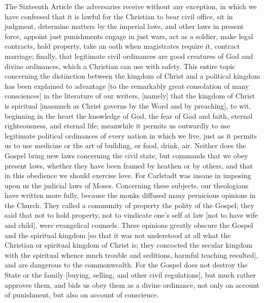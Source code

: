 The Sixteenth Article the adversaries receive without any exception,
in which we have confessed that it is lawful for the Christian to
bear civil office, sit in judgment, determine matters by the imperial
laws, and other laws in present force, appoint just punishments
engage in just wars, act as a soldier, make legal contracts, hold
property, take an oath when magistrates require it, contract marriage;
finally, that legitimate civil ordinances are good creatures of God
and divine ordinances, which a Christian can use with safety.  This
entire topic concerning the distinction between the kingdom of Christ
and a political kingdom has been explained to advantage [to the
remarkably great consolation of many consciences] in the literature
of our writers, [namely] that the kingdom of Christ is spiritual
[inasmuch as Christ governs by the Word and by preaching], to wit,
beginning in the heart the knowledge of God, the fear of God and
faith, eternal righteousness, and eternal life; meanwhile it permits
us outwardly to use legitimate political ordinances of every nation
in which we live, just as it permits us to use medicine or the art of
building, or food, drink, air.  Neither does the Gospel bring new
laws concerning the civil state, but commands that we obey present
laws, whether they have been framed by heathen or by others, and that
in this obedience we should exercise love.  For Carlstadt was insane
in imposing upon us the judicial laws of Moses.  Concerning these
subjects, our theologians have written more fully, because the monks
diffused many pernicious opinions in the Church.  They called a
community of property the polity of the Gospel; they said that not to
hold property, not to vindicate one's self at law [not to have wife
and child], were evangelical counsels.  These opinions greatly
obscure the Gospel and the spiritual kingdom [so that it was not
understood at all what the Christian or spiritual kingdom of Christ
is; they concocted the secular kingdom with the spiritual whence much
trouble and seditions, harmful teaching resulted], and are dangerous
to the commonwealth.  For the Gospel does not destroy the State or
the family [buying, selling, and other civil regulations], but much
rather approves them, and bids us obey them as a divine ordinance,
not only on account of punishment, but also on account of conscience.

